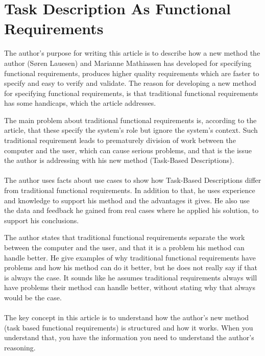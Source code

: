 \documentclass[Main]{subfiles}
\begin{document}
\section{Task Description As Functional Requirements}
The author's purpose for writing this article is to describe how a new method the author (Søren Lauesen) and Marianne Mathiassen has developed for specifying functional requirements, produces higher quality requirements which are faster to specify and easy to verify and validate.
The reason for developing a new method for specifying functional requirements, is that traditional functional requirements has some handicaps, which the article addresses. 

The main problem about traditional functional requirements is, according to the article, that these specify the system's role but ignore the system's context. 
Such traditional requirement leads to prematurely division of work between the computer and the user, which can cause serious problems, and that is the issue the author is addressing with his new method\cite{Task} (Task-Based Descriptions).
\\
\\
The author uses facts about use cases to show how Task-Based Descriptions differ from traditional functional requirements.  
In addition to that, he uses experience and knowledge to support his method and the advantages it gives. 
He also use the data and feedback he gained from real cases where he applied his solution, to support his conclusions.

The author states that traditional functional requirements separate the work between the computer and the user, and that it is a problem his method can handle better. 
He give examples of why traditional functional requirements have problems and how his method can do it better, but he does not really say if that is always the case. 
It sounds like he assumes traditional requirements always will have problems their method can handle better, without stating why that always would be the case.
\\
\\
The key concept in this article is to understand how the author's new method (task based functional requirements) is structured and how it works. 
When you understand that, you have the information you need to understand the author's reasoning.
\end{document}
